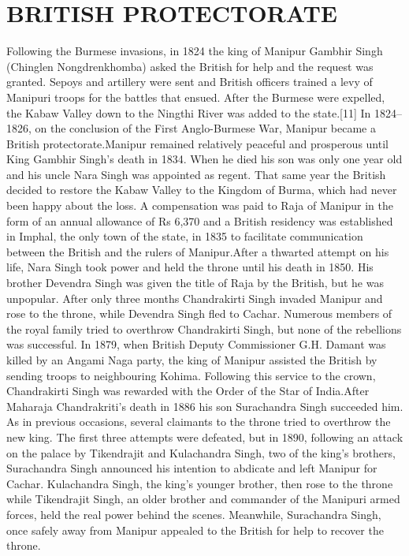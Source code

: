 \documentclass[10pt,a4 paper,two column]{article}
\begin{document}
\section{BRITISH PROTECTORATE}
Following the Burmese invasions, in 1824 the king of Manipur Gambhir Singh (Chinglen Nongdrenkhomba) asked the British for help and the request was granted. Sepoys and artillery were sent and British officers trained a levy of Manipuri troops for the battles that ensued. After the Burmese were expelled, the Kabaw Valley down to the Ningthi River was added to the state.[11] In 1824–1826, on the conclusion of the First Anglo-Burmese War, Manipur became a British protectorate.Manipur remained relatively peaceful and prosperous until King Gambhir Singh's death in 1834. When he died his son was only one year old and his uncle Nara Singh was appointed as regent. That same year the British decided to restore the Kabaw Valley to the Kingdom of Burma, which had never been happy about the loss. A compensation was paid to Raja of Manipur in the form of an annual allowance of Rs 6,370 and a British residency was established in Imphal, the only town of the state, in 1835 to facilitate communication between the British and the rulers of Manipur.After a thwarted attempt on his life, Nara Singh took power and held the throne until his death in 1850. His brother Devendra Singh was given the title of Raja by the British, but he was unpopular. After only three months Chandrakirti Singh invaded Manipur and rose to the throne, while Devendra Singh fled to Cachar. Numerous members of the royal family tried to overthrow Chandrakirti Singh, but none of the rebellions was successful. In 1879, when British Deputy Commissioner G.H. Damant was killed by an Angami Naga party, the king of Manipur assisted the British by sending troops to neighbouring Kohima. Following this service to the crown, Chandrakirti Singh was rewarded with the Order of the Star of India.After Maharaja Chandrakriti's death in 1886 his son Surachandra Singh succeeded him. As in previous occasions, several claimants to the throne tried to overthrow the new king. The first three attempts were defeated, but in 1890, following an attack on the palace by Tikendrajit and Kulachandra Singh, two of the king's brothers, Surachandra Singh announced his intention to abdicate and left Manipur for Cachar. Kulachandra Singh, the king's younger brother, then rose to the throne while Tikendrajit Singh, an older brother and commander of the Manipuri armed forces, held the real power behind the scenes. Meanwhile, Surachandra Singh, once safely away from Manipur appealed to the British for help to recover the throne.
\end{document}
